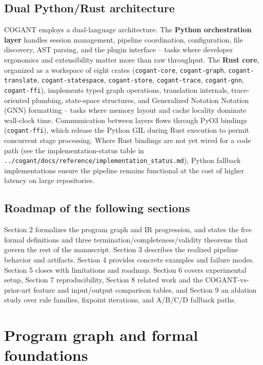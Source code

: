 \documentclass[
]{article}
\begin{document}
\subsection{Dual Python/Rust
architecture}\label{dual-pythonrust-architecture}

COGANT employs a dual-language architecture. The \textbf{Python
orchestration layer} handles session management, pipeline coordination,
configuration, file discovery, AST parsing, and the plugin interface --
tasks where developer ergonomics and extensibility matter more than raw
throughput. The \textbf{Rust core}, organized as a workspace of eight
crates (\texttt{cogant-core}, \texttt{cogant-graph},
\texttt{cogant-translate}, \texttt{cogant-statespace},
\texttt{cogant-store}, \texttt{cogant-trace}, \texttt{cogant-gnn},
\texttt{cogant-ffi}), implements typed graph operations, translation
internals, trace-oriented plumbing, state-space structures, and
Generalized Notation Notation (GNN) formatting -- tasks where memory
layout and cache locality dominate wall-clock time. Communication
between layers flows through PyO3 bindings (\texttt{cogant-ffi}), which
release the Python GIL during Rust execution to permit concurrent stage
processing. Where Rust bindings are not yet wired for a code path (see
the implementation-status table in
\texttt{../cogant/docs/reference/implementation\_status.md}), Python
fallback implementations ensure the pipeline remains functional at the
cost of higher latency on large repositories.

\subsection{Roadmap of the following
sections}\label{roadmap-of-the-following-sections}

Section 2 formalizes the program graph and IR progression, and states
the five formal definitions and three termination/completeness/validity
theorems that govern the rest of the manuscript. Section 3 describes the
realized pipeline behavior and artifacts. Section 4 provides concrete
examples and failure modes. Section 5 closes with limitations and
roadmap. Section 6 covers experimental setup, Section 7 reproducibility,
Section 8 related work and the COGANT-vs-prior-art feature and
input/output comparison tables, and Section 9 an ablation study over
rule families, fixpoint iterations, and A/B/C/D fallback paths.

\newpage

\section{Program graph and formal
foundations}\label{program-graph-and-formal-foundations}
\end{document}

